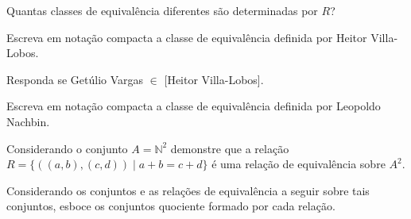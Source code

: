 \begin{exerList}
	\item Quantas classes de equivalência diferentes são determinadas por $R$?
	\item Escreva em notação compacta a classe de equivalência definida por Heitor Villa-Lobos.
	\item Responda se Getúlio Vargas $\in$ [Heitor Villa-Lobos].
	\item Escreva em notação compacta a classe de equivalência definida por Leopoldo Nachbin.
\end{exerList}

\begin{problem}\label{prob:EquivalenciaOrdem2}
	Considerando o conjunto $A = \mathbb{N}^2$ demonstre que a relação $R = \{((a, b), (c, d)) \mid a+b = c+d\}$ é uma relação de equivalência sobre $A^2$.
\end{problem}

\begin{problem}\label{prob:EquivalenciaOrdem3}
	Considerando os conjuntos e as relações de equivalência a seguir sobre tais conjuntos, esboce os conjuntos quociente formado por cada relação.
\end{problem}

